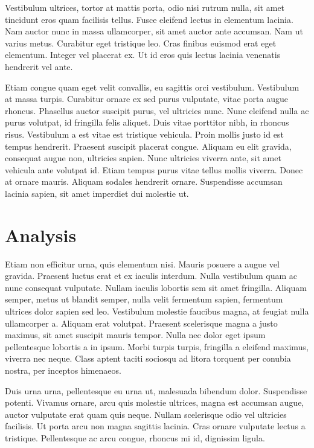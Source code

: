 \documentclass[
  12pt,
]{article}
\begin{document}
Vestibulum ultrices, tortor at mattis porta, odio nisi rutrum nulla, sit
amet tincidunt eros quam facilisis tellus. Fusce eleifend lectus in
elementum lacinia. Nam auctor nunc in massa ullamcorper, sit amet auctor
ante accumsan. Nam ut varius metus. Curabitur eget tristique leo. Cras
finibus euismod erat eget elementum. Integer vel placerat ex. Ut id eros
quis lectus lacinia venenatis hendrerit vel ante.

Etiam congue quam eget velit convallis, eu sagittis orci vestibulum.
Vestibulum at massa turpis. Curabitur ornare ex sed purus vulputate,
vitae porta augue rhoncus. Phasellus auctor suscipit purus, vel
ultricies nunc. Nunc eleifend nulla ac purus volutpat, id fringilla
felis aliquet. Duis vitae porttitor nibh, in rhoncus risus. Vestibulum a
est vitae est tristique vehicula. Proin mollis justo id est tempus
hendrerit. Praesent suscipit placerat congue. Aliquam eu elit gravida,
consequat augue non, ultricies sapien. Nunc ultricies viverra ante, sit
amet vehicula ante volutpat id. Etiam tempus purus vitae tellus mollis
viverra. Donec at ornare mauris. Aliquam sodales hendrerit ornare.
Suspendisse accumsan lacinia sapien, sit amet imperdiet dui molestie ut.

\section{Analysis}\label{analysis}

Etiam non efficitur urna, quis elementum nisi. Mauris posuere a augue
vel gravida. Praesent luctus erat et ex iaculis interdum. Nulla
vestibulum quam ac nunc consequat vulputate. Nullam iaculis lobortis sem
sit amet fringilla. Aliquam semper, metus ut blandit semper, nulla velit
fermentum sapien, fermentum ultrices dolor sapien sed leo. Vestibulum
molestie faucibus magna, at feugiat nulla ullamcorper a. Aliquam erat
volutpat. Praesent scelerisque magna a justo maximus, sit amet suscipit
mauris tempor. Nulla nec dolor eget ipsum pellentesque lobortis a in
ipsum. Morbi turpis turpis, fringilla a eleifend maximus, viverra nec
neque. Class aptent taciti sociosqu ad litora torquent per conubia
nostra, per inceptos himenaeos.

Duis urna urna, pellentesque eu urna ut, malesuada bibendum dolor.
Suspendisse potenti. Vivamus ornare, arcu quis molestie ultrices, magna
est accumsan augue, auctor vulputate erat quam quis neque. Nullam
scelerisque odio vel ultricies facilisis. Ut porta arcu non magna
sagittis lacinia. Cras ornare vulputate lectus a tristique. Pellentesque
ac arcu congue, rhoncus mi id, dignissim ligula.
\end{document}
